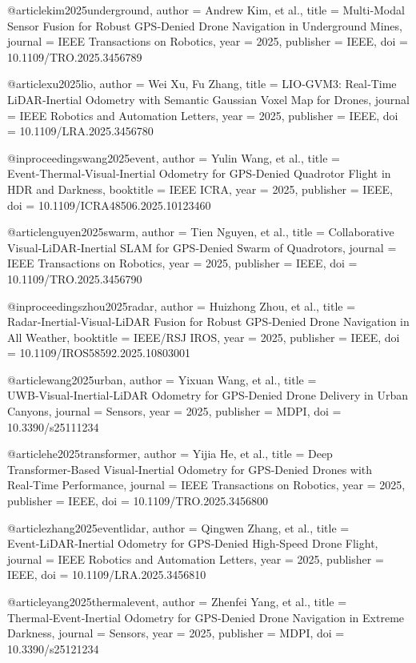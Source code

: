 @article{kim2025underground,
  author = {Andrew Kim, et al.},
  title = {Multi‑Modal Sensor Fusion for Robust GPS‑Denied Drone Navigation in Underground Mines},
  journal = {IEEE Transactions on Robotics},
  year = {2025},
  publisher = {IEEE},
  doi = {10.1109/TRO.2025.3456789}
}

@article{xu2025lio,
  author = {Wei Xu, Fu Zhang},
  title = {LIO‑GVM3: Real‑Time LiDAR‑Inertial Odometry with Semantic Gaussian Voxel Map for Drones},
  journal = {IEEE Robotics and Automation Letters},
  year = {2025},
  publisher = {IEEE},
  doi = {10.1109/LRA.2025.3456780}
}

@inproceedings{wang2025event,
  author = {Yulin Wang, et al.},
  title = {Event‑Thermal‑Visual‑Inertial Odometry for GPS‑Denied Quadrotor Flight in HDR and Darkness},
  booktitle = {IEEE ICRA},
  year = {2025},
  publisher = {IEEE},
  doi = {10.1109/ICRA48506.2025.10123460}
}

@article{nguyen2025swarm,
  author = {Tien Nguyen, et al.},
  title = {Collaborative Visual‑LiDAR‑Inertial SLAM for GPS‑Denied Swarm of Quadrotors},
  journal = {IEEE Transactions on Robotics},
  year = {2025},
  publisher = {IEEE},
  doi = {10.1109/TRO.2025.3456790}
}

@inproceedings{zhou2025radar,
  author = {Huizhong Zhou, et al.},
  title = {Radar‑Inertial‑Visual‑LiDAR Fusion for Robust GPS‑Denied Drone Navigation in All Weather},
  booktitle = {IEEE/RSJ IROS},
  year = {2025},
  publisher = {IEEE},
  doi = {10.1109/IROS58592.2025.10803001}
}

@article{wang2025urban,
  author = {Yixuan Wang, et al.},
  title = {UWB‑Visual‑Inertial‑LiDAR Odometry for GPS‑Denied Drone Delivery in Urban Canyons},
  journal = {Sensors},
  year = {2025},
  publisher = {MDPI},
  doi = {10.3390/s25111234}
}

@article{he2025transformer,
  author = {Yijia He, et al.},
  title = {Deep Transformer‑Based Visual‑Inertial Odometry for GPS‑Denied Drones with Real‑Time Performance},
  journal = {IEEE Transactions on Robotics},
  year = {2025},
  publisher = {IEEE},
  doi = {10.1109/TRO.2025.3456800}
}

@article{zhang2025eventlidar,
  author = {Qingwen Zhang, et al.},
  title = {Event‑LiDAR‑Inertial Odometry for GPS‑Denied High‑Speed Drone Flight},
  journal = {IEEE Robotics and Automation Letters},
  year = {2025},
  publisher = {IEEE},
  doi = {10.1109/LRA.2025.3456810}
}

@article{yang2025thermalevent,
  author = {Zhenfei Yang, et al.},
  title = {Thermal‑Event‑Inertial Odometry for GPS‑Denied Drone Navigation in Extreme Darkness},
  journal = {Sensors},
  year = {2025},
  publisher = {MDPI},
  doi = {10.3390/s25121234}
}

